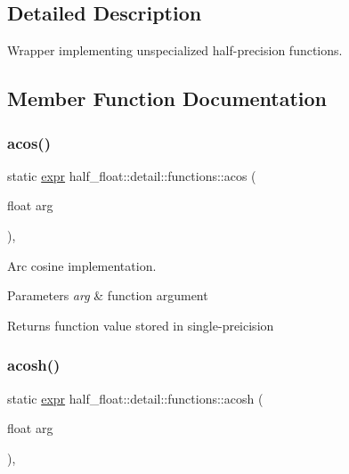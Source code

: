\subsection{Detailed Description}
Wrapper implementing unspecialized half-\/precision functions. 

\subsection{Member Function Documentation}
\mbox{\label{structhalf__float_1_1detail_1_1functions_a89ec536194900bba8dd56271458f2083}} 
\subsubsection{\texorpdfstring{acos()}{acos()}}
{\footnotesize\ttfamily static \hyperlink{structhalf__float_1_1detail_1_1expr}{expr} half\+\_\+float\+::detail\+::functions\+::acos (\begin{DoxyParamCaption}\item[{float}]{arg }\end{DoxyParamCaption})\hspace{0.3cm}{\ttfamily [inline]}, {\ttfamily [static]}}

Arc cosine implementation. 
\begin{DoxyParams}{Parameters}
{\em arg} & function argument \\
\hline
\end{DoxyParams}
\begin{DoxyReturn}{Returns}
function value stored in single-\/preicision 
\end{DoxyReturn}
\mbox{\label{structhalf__float_1_1detail_1_1functions_a973c481a675e66cc1bed66b4de291242}} 
\subsubsection{\texorpdfstring{acosh()}{acosh()}}
{\footnotesize\ttfamily static \hyperlink{structhalf__float_1_1detail_1_1expr}{expr} half\+\_\+float\+::detail\+::functions\+::acosh (\begin{DoxyParamCaption}\item[{float}]{arg }\end{DoxyParamCaption})\hspace{0.3cm}{\ttfamily [inline]}, {\ttfamily [static]}}

